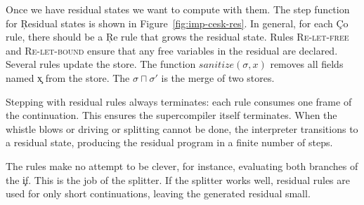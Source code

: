 Once we have residual states we want to compute with them. The step function
for \c{Residual} states is shown in Figure~\ref{fig:imp-cesk-res}.
In general, for each \c{Co} rule, there should be a \c{Re} rule that
grows the residual state.
Rules \textsc{Re-let-free} and \textsc{Re-let-bound} ensure 
that any free variables in the residual are declared.
Several rules update the store. The function $\mathit{sanitize}(\sigma, x)$
removes all fields named \c{x} from the store.
The $\sigma \sqcap \sigma'$ is the merge of two stores.

Stepping with residual rules always terminates: each rule consumes one 
frame of the continuation.
This ensures the supercompiler itself terminates.
When the whistle blows or driving or splitting cannot be done,
the interpreter transitions to a residual state, producing the residual
program in a finite number of steps.

The rules make no attempt to be clever, for instance, evaluating both branches
of the \c{if}. This is the job of the splitter.
If the splitter works well, residual rules are used for only short continuations,
leaving the generated residual small.

